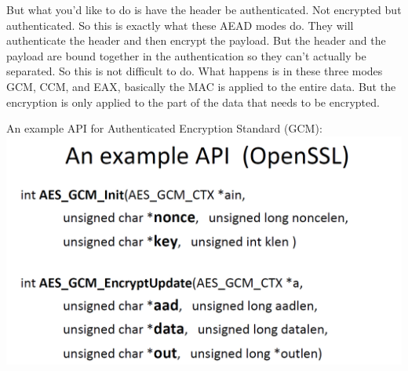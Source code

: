 \documentclass[11pt]{article}
\makeatletter
\def\maxwidth{\ifdim\Gin@nat@width>\linewidth\linewidth
    \else\Gin@nat@width\fi}
\let\Oldincludegraphics\includegraphics
\renewcommand{\includegraphics}[1]{\Oldincludegraphics[width=.8\maxwidth]{#1}}
\makeatother
\begin{document}
But what you'd like to do is have the header be authenticated. Not
encrypted but authenticated. So this is exactly what these AEAD modes
do. They will authenticate the header and then encrypt the payload. But
the header and the payload are bound together in the authentication so
they can't actually be separated. So this is not difficult to do. What
happens is in these three modes GCM, CCM, and EAX, basically the MAC is
applied to the entire data. But the encryption is only applied to the
part of the data that needs to be encrypted.

An example API for Authenticated Encryption Standard (GCM):
\includegraphics{./Images/AE-ExampleAPI.png}
\end{document}
